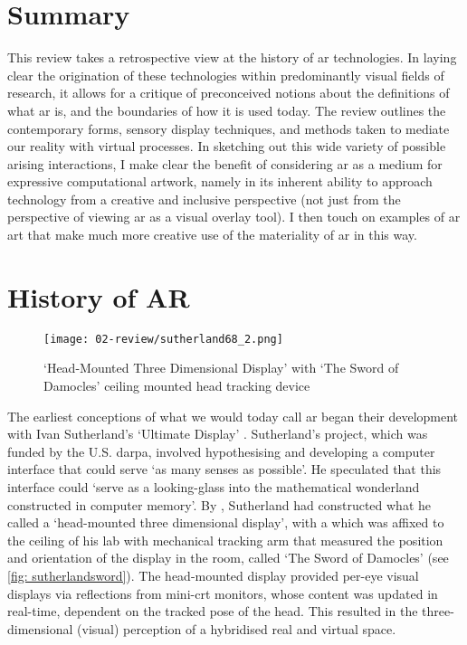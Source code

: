 \section{Summary}\label{sec: review-summary}
This review takes a retrospective view at the history of \gls{ar} technologies. In laying clear the origination of these technologies within predominantly visual fields of research, it allows for a critique of preconceived notions about the definitions of what \gls{ar} is, and the boundaries of how it is used today. The review outlines the contemporary forms, sensory display techniques, and methods taken to mediate our reality with virtual processes. In sketching out this wide variety of possible arising interactions, I make clear the benefit of considering \gls{ar} as a medium for expressive computational artwork, namely in its inherent ability to approach technology from a creative and inclusive perspective (not just from the perspective of viewing \gls{ar} as a visual overlay tool). I then touch on examples of \gls{ar} art that make much more creative use of the materiality of \gls{ar} in this way.



\section{History of AR}\label{sec: ar-history}
\begin{wrapfigure}{r}{0.45\textwidth}
    \vspace{-\intextsep}
    \hfill
    \begin{minipage}{0.95\linewidth}
        \texttt{[image: 02-review/sutherland68\_2.png]}
        \captionsetup{justification=justified}
        \caption{`Head-Mounted Three Dimensional Display' with `The Sword of Damocles' ceiling mounted head tracking device \citep[in][]{sutherland1968}}\label{fig: sutherlandsword}
    \end{minipage}
\end{wrapfigure}
The earliest conceptions of what we would today call \gls{ar} began their development with Ivan Sutherland's `Ultimate Display' \citeyearpar{sutherland1965}. Sutherland's project, which was funded by the U.S. \gls{darpa}, involved hypothesising and developing a computer interface that could serve `as many senses as possible'. He speculated that this interface could `serve as a looking-glass into the mathematical wonderland constructed in computer memory'. By \citeyear{sutherland1968}, Sutherland had constructed what he called a `head-mounted three dimensional display', with a which was affixed to the ceiling of his lab with mechanical tracking arm that measured the position and orientation of the display in the room, called `The Sword of Damocles' (see \autoref{fig: sutherlandsword}). The head-mounted display provided per-eye visual displays via reflections from mini-\gls{crt} monitors, whose content was updated in real-time, dependent on the tracked pose of the head. This resulted in the three-dimensional (visual) perception of a hybridised real and virtual space.

